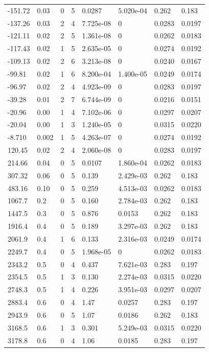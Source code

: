 \documentclass[preview]{standalone}
\begin{document}
{{\begin{tabular}{L{1.2cm}C{1.2cm} C{0.3cm}C{0.5cm} C{1.4cm}C{1.4cm} C{1.4cm}C{1.4cm}}
  -151.72  &  0.03  & 0     &  5 &  0.0287  & 5.020e-04  & 0.262 &  0.183   \\ 
  -137.26  &  0.03  & 2     &  4 &  7.725e-08  & 0  & 0.0283 &  0.0197   \\ 
  -121.11  &  0.02  & 2     &  5 &  1.361e-08  & 0  & 0.0262 &  0.0183   \\ 
  -117.43  &  0.02  & 1     &  5 &  2.635e-05  & 0  & 0.0274 &  0.0192   \\ 
  -109.13  &  0.02  & 2     &  6 &  3.213e-08  & 0  & 0.0240 &  0.0167   \\ 
  -99.81  &  0.02  & 1     &  6 &  8.200e-04  & 1.400e-05  & 0.0249 &  0.0174   \\ 
  -96.97  &  0.02  & 2     &  4 &  4.923e-09  & 0  & 0.0283 &  0.0197   \\ 
  -39.28  &  0.01  & 2     &  7 &  6.744e-09  & 0  & 0.0216 &  0.0151   \\ 
  -20.96  &  0.00  & 1     &  4 &  7.102e-06  & 0  & 0.0297 &  0.0207   \\ 
  -20.04  &  0.00  & 1     &  3 &  1.240e-05  & 0  & 0.0315 &  0.0220   \\ 
  -8.710  &  0.002  & 1     &  5 &  4.263e-07  & 0  & 0.0274 &  0.0192   \\ 
  120.45  &  0.02  & 2     &  4 &  2.060e-08  & 0  & 0.0283 &  0.0197   \\ 
  214.66  &  0.04  & 0     &  5 &  0.0107  & 1.860e-04  & 0.0262 &  0.0183   \\ 
  307.32  &  0.06  & 0     &  5 &  0.139  & 2.429e-03  & 0.262 &  0.183   \\ 
  483.16  &  0.10  & 0     &  5 &  0.259  & 4.513e-03  & 0.0262 &  0.0183   \\ 
  1067.7  &   0.2  & 0     &  5 &  0.160  & 2.784e-03  & 0.262 &  0.183   \\ 
  1447.5  &   0.3  & 0     &  5 &  0.876  & 0.0153  & 0.262 &  0.183   \\ 
  1916.4  &   0.4  & 0     &  5 &  0.189  & 3.297e-03  & 0.262 &  0.183   \\ 
  2061.9  &   0.4  & 1     &  6 &  0.133  & 2.316e-03  & 0.0249 &  0.0174   \\ 
  2249.7  &   0.4  & 0     &  5 &  1.968e-05  & 0  & 0.0262 &  0.0183   \\ 
  2343.2  &   0.5  & 0     &  4 &  0.437  & 7.621e-03  & 0.283 &  0.197   \\ 
  2354.5  &   0.5  & 1     &  3 &  0.130  & 2.274e-03  & 0.0315 &  0.0220   \\ 
  2748.3  &   0.5  & 1     &  4 &  0.226  & 3.951e-03  & 0.0297 &  0.0207   \\ 
  2883.4  &   0.6  & 0     &  4 &  1.47  & 0.0257  & 0.283 &  0.197   \\ 
  2943.9  &   0.6  & 0     &  5 &  1.07  & 0.0186  & 0.262 &  0.183   \\ 
  3168.5  &   0.6  & 1     &  3 &  0.301  & 5.249e-03  & 0.0315 &  0.0220   \\ 
  3178.8  &   0.6  & 0     &  4 &  1.06  & 0.0185  & 0.283 &  0.197   \\ 
\hline 
\end{tabular} 

}}
\end{document}
